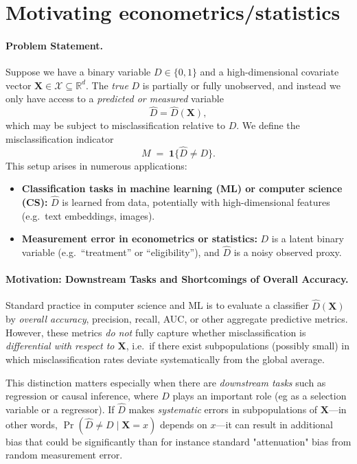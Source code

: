 \documentclass[11pt]{article}
\begin{document}
\section{Motivating econometrics/statistics}

\paragraph{Problem Statement.}
Suppose we have a binary variable $D \in \{0,1\}$ and a high-dimensional covariate vector $\mathbf{X} \in \mathcal{X} \subseteq \mathbb{R}^d$. The \emph{true} $D$ is partially or fully unobserved, and instead we only have access to a \emph{predicted or measured} variable
\[
  \widehat{D} = \widehat{D}(\mathbf{X}),
\]
which may be subject to misclassification relative to $D$. We define the misclassification indicator
\[
  M \;=\; \mathbf{1}\{\widehat{D} \neq D\}.
\]
This setup arises in numerous applications:
\begin{itemize}
  \item \textbf{Classification tasks in machine learning (ML) or computer science (CS):} $\widehat{D}$ is learned from data, potentially with high-dimensional features (e.g.\ text embeddings, images).
  \item \textbf{Measurement error in econometrics or statistics:} $D$ is a latent binary variable (e.g.\ ``treatment'' or ``eligibility''), and $\widehat{D}$ is a noisy observed proxy.
\end{itemize}

\paragraph{Motivation: Downstream Tasks and Shortcomings of Overall Accuracy.}
Standard practice in computer science and ML is to evaluate a classifier $\widehat{D}(\mathbf{X})$ by \emph{overall accuracy}, precision, recall, AUC, or other aggregate predictive metrics. However, these metrics \emph{do not} fully capture whether misclassification is \emph{differential with respect to $\mathbf{X}$}, i.e.\ if there exist subpopulations (possibly small) in which misclassification rates deviate systematically from the global average.

This distinction matters especially when there are \emph{downstream tasks} such as regression or causal inference, where $D$ plays an important role (eg as a selection variable or a regressor). If $\widehat{D}$ makes \emph{systematic} errors in subpopulations of $\mathbf{X}$---in other words, $\Pr(\widehat{D} \neq D \mid \mathbf{X} = x)$ depends on $x$---it can result in additional bias that could be significantly than for instance standard "attenuation" bias from random measurement error.
\end{document}

